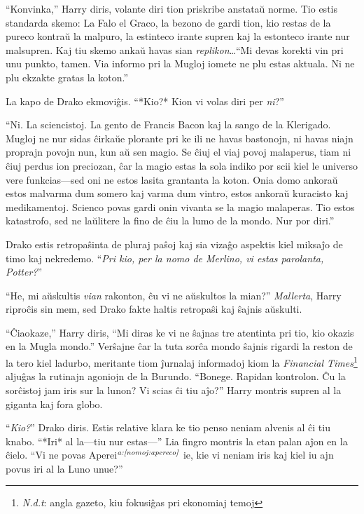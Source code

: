 ``Konvinka,'' Harry diris, volante diri tion priskribe anstataŭ
norme. Tio estis standarda skemo: La Falo el Graco, la bezono de gardi
tion, kio restas de la pureco kontraŭ la malpuro, la estinteco irante
supren kaj la estonteco irante nur malsupren. Kaj tiu skemo ankaŭ
havas sian \emph{replikon}\ldots ``Mi devas korekti vin pri unu
punkto, tamen. Via informo pri la Mugloj iomete ne plu estas
aktuala. Ni ne plu ekzakte gratas la koton.''

La kapo de Drako ekmoviĝis. ``*Kio?* Kion vi volas diri per \emph{ni}?''

``Ni. La sciencistoj. La gento de Francis Bacon kaj la sango de la
Klerigado. Mugloj ne nur sidas ĉirkaŭe plorante pri ke ili ne havas
bastonojn, ni havas niajn proprajn povojn nun, kun aŭ sen magio. Se
ĉiuj el viaj povoj malaperus, tiam ni ĉiuj perdus ion preciozan, ĉar
la magio estas la sola indiko por scii kiel le universo vere
funkcias—sed oni ne estos lasita grantanta la koton. Onia domo ankoraŭ
estos malvarma dum somero kaj varma dum vintro, estos ankoraŭ
kuracisto kaj medikamentoj. Scienco povas gardi onin vivanta se la
magio malaperas. Tio estos katastrofo, sed ne laŭlitere la fino de ĉiu
la lumo de la mondo. Nur por diri.''

Drako estis retropaŝinta de pluraj paŝoj kaj sia vizaĝo aspektis kiel
miksaĵo de timo kaj nekredemo. ``\emph{Pri kio, per la nomo de Merlino,
  vi estas parolanta, Potter?}''

``He, mi aŭskultis \emph{vian} rakonton, ĉu vi ne aŭskultos la mian?''
\emph{Mallerta}, Harry riproĉis sin mem, sed Drako fakte haltis
retropaŝi kaj ŝajnis aŭskulti.

``Ĉiaokaze,'' Harry diris, ``Mi diras ke vi ne ŝajnas tre atentinta
pri tio, kio okazis en la Mugla mondo.'' Verŝajne ĉar la tuta sorĉa
mondo ŝajnis rigardi la reston de la tero kiel ladurbo, meritante tiom
ĵurnalaj informadoj kiom la \emph{Financial
  Times}\footnote{\emph{N.d.t}: angla gazeto, kiu fokusiĝas pri
  ekonomiaj temoj} aljuĝas la rutinajn agoniojn de la
Burundo. ``Bonege. Rapidan kontrolon. Ĉu la sorĉistoj jam iris sur la
lunon? Vi scias ĉi tiu aĵo?'' Harry montris supren al la giganta kaj
fora globo.

``\emph{Kio?}'' Drako diris. Estis relative klara ke tio penso neniam
alvenis al ĉi tiu knabo. ``*Iri* al la—tiu nur estas—'' Lia fingro
montris la etan palan aĵon en la ĉielo. ``Vi ne povas
Aperei$^{\textit{a:\ref{nomoj:apereco}}}$ ie, kie vi neniam iris kaj kiel iu ajn
  povus iri al la Luno unue?''

